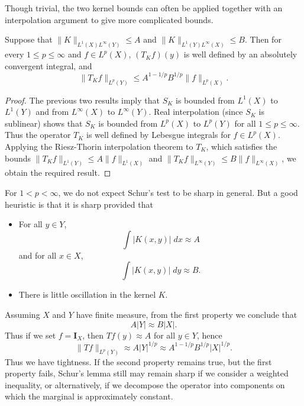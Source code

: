 Though trivial, the two kernel bounds can often be applied together with an interpolation argument to give more complicated bounds.

\begin{theorem}
  Suppose that $\| K \|_{L^1(X) L^\infty(Y)} \leq A$ and $\| K \|_{L^1(Y) L^\infty(X)} \leq B$. Then for every $1 \leq p \leq \infty$ and $f \in L^p(X)$, $(T_K f)(y)$ is well defined by an absolutely convergent integral, and
  \[ \| T_K f \|_{L^p(Y)} \leq A^{1 - 1/p} B^{1/p} \| f \|_{L^p(X)}. \]
\end{theorem}
\begin{proof}
  The previous two results imply that $S_K$ is bounded from $L^1(X)$ to $L^1(Y)$ and from $L^\infty(X)$ to $L^\infty(Y)$. Real interpolation (since $S_K$ is sublinear) shows that $S_K$ is bounded from $L^p(X)$ to $L^p(Y)$ for all $1 \leq p \leq \infty$. Thus the operator $T_K$ is well defined by Lebesgue integrals for $f \in L^p(X)$. Applying the Riesz-Thorin interpolation theorem to $T_K$, which satisfies the bounds $\| T_K f \|_{L^1(Y)} \leq A \| f \|_{L^1(X)}$ and $\| T_K f \|_{L^\infty(Y)} \leq B \| f \|_{L^\infty(X)}$, we obtain the required result.
\end{proof}

For $1 < p < \infty$, we do not expect Schur's test to be sharp in general. But a good heuristic is that it is sharp provided that
%
\begin{itemize}
  \item For all $y \in Y$,
  \[ \int |K(x,y)|\; dx \approx A \]
  and for all $x \in X$,
  \[ \int |K(x,y)|\; dy \approx B. \]

  \item There is little oscillation in the kernel $K$.
\end{itemize}
%
Assuming $X$ and $Y$ have finite measure, from the first property we conclude that
%
\[ A |Y| \approx B |X|. \]
%
Thus if we set $f = \mathbf{I}_X$, then $Tf(y) \approx A$ for all $y \in Y$, hence
%
\[ \| Tf \|_{L^p(Y)} \approx A |Y|^{1/p} \approx A^{1 - 1/p} B^{1/p} |X|^{1/p}. \]
%
Thus we have tightness. If the second property remains true, but the first property fails, Schur's lemma still may remain sharp if we consider a weighted inequality, or alternatively, if we decompose the operator into components on which the marginal is approximately constant.

